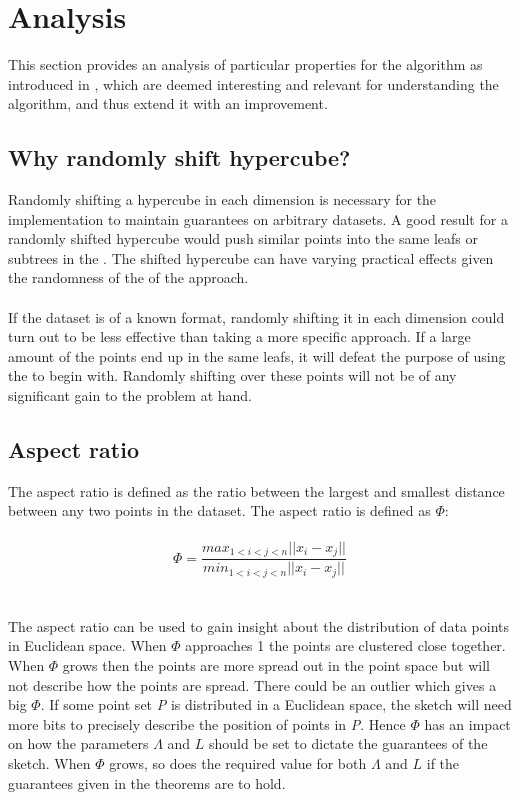 \section{Analysis}
\label{analysis}
This section provides an analysis of particular properties for the \qs{} algorithm as introduced in \cite{wagner17}, which are deemed interesting and relevant for understanding the algorithm, and thus extend it with an improvement.


\subsection{Why randomly shift hypercube?}
Randomly shifting a hypercube in each dimension is necessary for the \qs{} implementation to maintain guarantees on arbitrary datasets. A good result for a randomly shifted hypercube would push similar points into the same leafs or subtrees in the \qt{}. The shifted hypercube can have varying practical effects given the randomness of the of the approach.
\\
\\
If the dataset is of a known format, randomly shifting it in each dimension could turn out to be less effective than taking a more specific approach. If a large amount of the points end up in the same leafs, it will defeat the purpose of using the \qt{} to begin with. Randomly shifting over these points will not be of any significant gain to the problem at hand.

\subsection{Aspect ratio}
\label{sec:aspect_ratio}
The aspect ratio is defined as the ratio between the largest and smallest distance between any two points in the dataset\cite{wagner17}. The aspect ratio is defined as $\Phi$:
\\
\\
$$ \Phi = \frac{max_{1<i<j<n} || x_i - x_j || }{min_{1<i<j<n} || x_i - x_j || } $$
\\
\\
The aspect ratio can be used to gain insight about the distribution of data points in Euclidean space. When $\Phi$ approaches 1 the points are clustered close together. When $\Phi$ grows then the points are more spread out in the point space but will not describe how the points are spread. There could be an outlier which gives a big $\Phi$. If some point set \textit{P} is distributed in a Euclidean space, the sketch will need more bits to precisely describe the position of points in \textit{P}. Hence $\Phi$ has an impact on how the parameters $\Lambda$ and $L$ should be set to dictate the guarantees of the sketch. When $\Phi$ grows, so does the required value for both $\Lambda$ and $L$ if the guarantees given in the theorems are to hold. 


